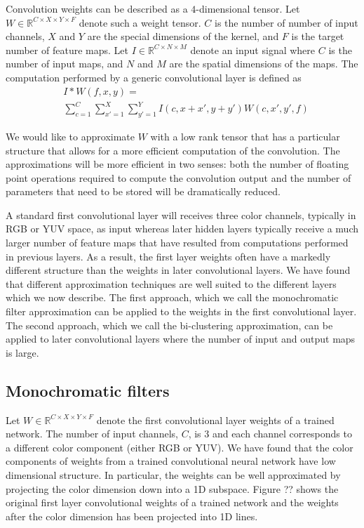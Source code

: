 Convolution weights can be described as a $4$-dimensional tensor. Let $W \in \mathbb{R}^{C \times X \times Y \times F}$ 
denote such a weight tensor. $C$ is the number of number of input channels, $X$ and $Y$ are the special dimensions of the kernel, and $F$ is the target number of feature maps.
Let $I \in \mathbb{R}^{C \times N \times M}$ denote an input signal where $C$ is the number of input maps, and $N$ and $M$ are the spatial dimensions of the maps.
The computation performed by a generic convolutional layer is defined as
\begin{align*}
\label{convlayereq}
&I \ast W (f,x,y) = \\
&\sum_{c=1}^C \sum_{x'=1}^{X} \sum_{y'=1}^{Y} I(c,x+x',y+y') W(c,x',y',f)
\end{align*}

We would like to approximate $W$ with a low rank tensor that has a particular structure that allows for a more efficient computation of the convolution. The approximations will be more efficient in two senses: both the number of floating point operations required to compute the convolution output and the number of parameters that need to be stored will be dramatically reduced. 

A standard first convolutional layer will receives three color channels, typically in RGB or YUV space, as input whereas later hidden layers typically receive a much larger number of feature maps that have resulted from computations performed in previous layers. As a result, the first layer weights often have a markedly different structure than the weights in later convolutional layers. We have found that different approximation techniques are well suited to the different layers which we now describe. The first approach, which we call the monochromatic filter approximation can be applied to the weights in the first convolutional layer. The second approach, which we call the bi-clustering approximation,  can be applied to later convolutional layers where the number of input and output maps is large. 

\subsection{Monochromatic filters}
Let $W \in \mathbb{R}^{C \times X \times Y \times F}$ denote the first convolutional layer weights of a trained network. The number of input channels, $C$, is 3 and each channel corresponds to a different color component (either RGB or YUV). We have found that the color components of weights from a trained convolutional neural network have low dimensional structure. In particular, the weights can be well approximated by projecting the color dimension down into a 1D subspace. Figure ?? shows the original first layer convolutional weights of a trained network and the weights after the color dimension has been projected into 1D lines. 

